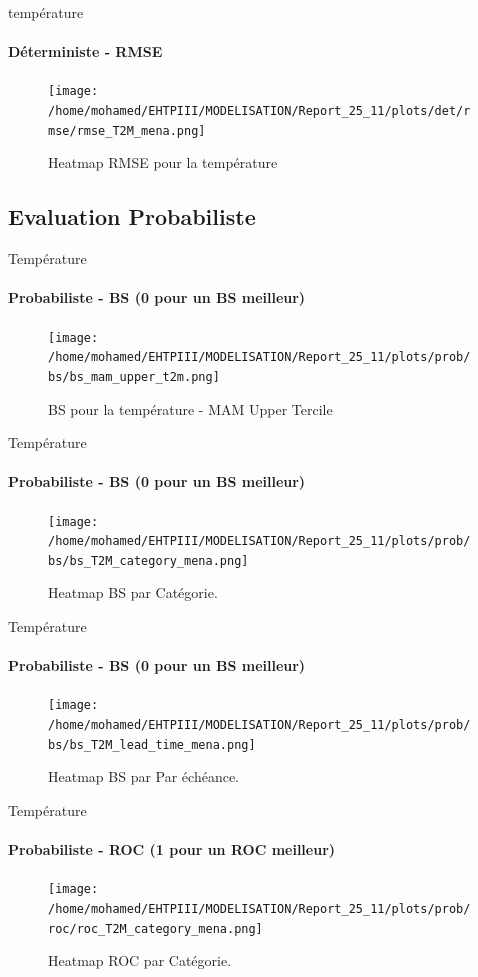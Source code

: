 \begin{frame}{température}
\framesubtitle{Déterministe - RMSE}

\begin{figure}
    \centering 
    \texttt{[image: /home/mohamed/EHTPIII/MODELISATION/Report\_25\_11/plots/det/rmse/rmse\_T2M\_mena.png]}
    \caption{Heatmap RMSE pour la température  }
    \label{fig:enter-label}
\end{figure}
\end{frame}

\subsection{Evaluation Probabiliste}

\begin{frame}{Température}
\framesubtitle{Probabiliste - BS (0 pour un BS meilleur)}

\begin{figure}
    \centering
    \texttt{[image: /home/mohamed/EHTPIII/MODELISATION/Report\_25\_11/plots/prob/bs/bs\_mam\_upper\_t2m.png]}
    \caption{BS pour la température - MAM  Upper Tercile }
    \label{fig:enter-label}
\end{figure}
\end{frame}

\begin{frame}{Température}
\framesubtitle{Probabiliste - BS (0 pour un BS meilleur)}

\begin{figure}
    \centering
    \texttt{[image: /home/mohamed/EHTPIII/MODELISATION/Report\_25\_11/plots/prob/bs/bs\_T2M\_category\_mena.png]}
    \caption{Heatmap BS par Catégorie.  }
    \label{fig:enter-label}
\end{figure}
\end{frame}


\begin{frame}{Température}
\framesubtitle{Probabiliste - BS (0 pour un BS meilleur)}

\begin{figure}
    \centering
    \texttt{[image: /home/mohamed/EHTPIII/MODELISATION/Report\_25\_11/plots/prob/bs/bs\_T2M\_lead\_time\_mena.png]}
    \caption{Heatmap BS par Par échéance.}
    \label{fig:enter-label}
\end{figure}
\end{frame}


\begin{frame}{Température}
\framesubtitle{Probabiliste - ROC (1 pour un ROC meilleur)}

\begin{figure}
    \centering
    \texttt{[image: /home/mohamed/EHTPIII/MODELISATION/Report\_25\_11/plots/prob/roc/roc\_T2M\_category\_mena.png]}
    \caption{Heatmap ROC par Catégorie.  }
    \label{fig:enter-label}
\end{figure}
\end{frame}


